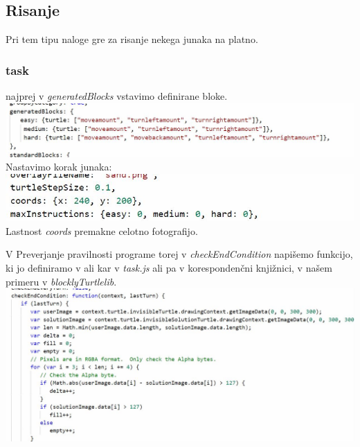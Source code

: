 \documentclass[11pt]{article} %
\begin{document}
\subsection{Risanje}

Pri tem tipu naloge gre za risanje nekega junaka na platno.

\subsubsection{task}

najprej v \textit{generatedBlocks} vstavimo definirane bloke.\\
\includegraphics[scale=0.5]{risanje_generirani_bloki} \\
Nastavimo korak junaka:\\
\includegraphics[scale=0.5]{risanje_step_size_coords} \\
Lastnost \textit{coords} premakne celotno fotografijo.

V Preverjanje pravilnosti programe torej v \textit{checkEndCondition} napišemo funkcijo, ki jo definiramo v ali kar v \textit{task.js} ali pa v korespondenčni knjižnici, v našem primeru v \textit{blocklyTurtle\textunderscore lib}.
\includegraphics[scale=0.5]{risanje_check_end_condition} \\
\end{document}
